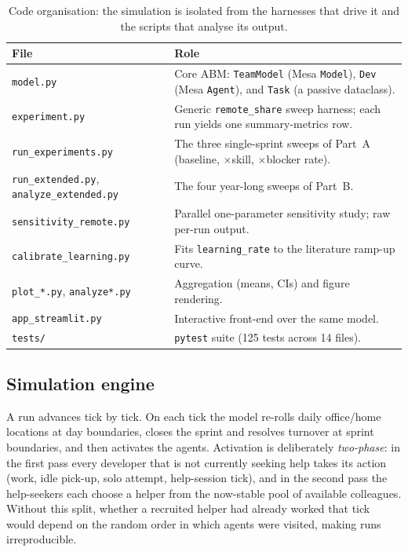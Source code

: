 \documentclass[11pt,a4paper]{article}
\begin{document}
\begin{table}[H]
\centering
\caption{Code organisation: the simulation is isolated from the harnesses that drive it and the
scripts that analyse its output.}
\label{tab:code}
\small
\setlength{\tabcolsep}{6pt}
\begin{tabular}{p{3.5cm}p{9.4cm}}
\toprule
File & Role \\
\midrule
\texttt{model.py} & Core ABM: \texttt{TeamModel} (Mesa \texttt{Model}), \texttt{Dev} (Mesa \texttt{Agent}), and \texttt{Task} (a passive dataclass). \\
\texttt{experiment.py} & Generic \texttt{remote\_share} sweep harness; each run yields one summary-metrics row. \\
\texttt{run\_experiments.py} & The three single-sprint sweeps of Part~A (baseline, $\times$skill, $\times$blocker rate). \\
\texttt{run\_extended.py}, \texttt{analyze\_extended.py} & The four year-long sweeps of Part~B. \\
\texttt{sensitivity\_remote.py} & Parallel one-parameter sensitivity study; raw per-run output. \\
\texttt{calibrate\_learning.py} & Fits \texttt{learning\_rate} to the literature ramp-up curve. \\
\texttt{plot\_*.py}, \texttt{analyze*.py} & Aggregation (means, CIs) and figure rendering. \\
\texttt{app\_streamlit.py} & Interactive front-end over the same model. \\
\texttt{tests/} & \texttt{pytest} suite (125 tests across 14 files). \\
\bottomrule
\end{tabular}
\end{table}

\subsection{Simulation engine}

A run advances tick by tick. On each tick the model re-rolls daily office/home locations at day
boundaries, closes the sprint and resolves turnover at sprint boundaries, and then activates the
agents. Activation is deliberately \emph{two-phase}: in the first pass every developer that is not
currently seeking help takes its action (work, idle pick-up, solo attempt, help-session tick), and
in the second pass the help-seekers each choose a helper from the now-stable pool of available
colleagues. Without this split, whether a recruited helper had already worked that tick would depend
on the random order in which agents were visited, making runs irreproducible.
\end{document}
